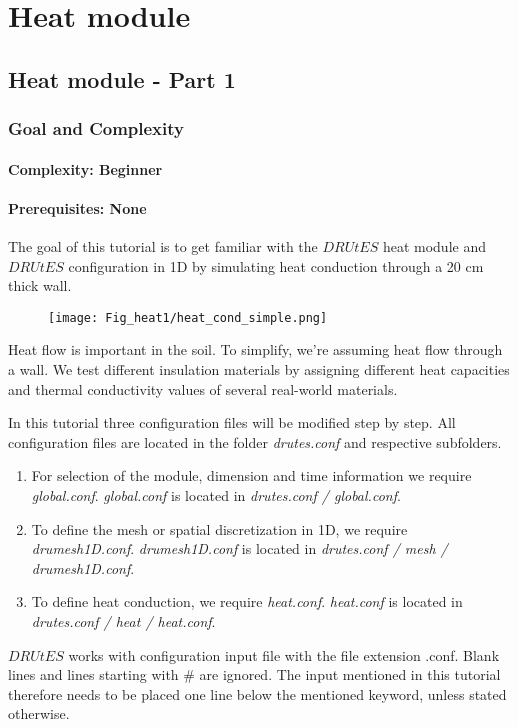 
\chapter{Heat module}

\section{Heat module - Part 1}


\subsection{Goal and Complexity}
\subsubsection*{Complexity: Beginner}

\subsubsection*{Prerequisites: None}

The goal of this tutorial is to get familiar with the $DRUtES$ heat module and  $DRUtES$ configuration in 1D by simulating heat conduction through a 20 cm thick wall.\medskip

\begin{figure}[!h]
\centering
\texttt{[image: Fig\_heat1/heat\_cond\_simple.png]}
\end{figure}
Heat flow is important in the soil. To simplify, we're assuming heat flow through a wall. We test different insulation materials by assigning different heat capacities and thermal conductivity values of several real-world materials. 

In this tutorial three configuration files will be modified step by step. All configuration files are located in the folder \emph{drutes.conf} and respective subfolders. \begin{enumerate}
\item For selection of the module, dimension and time information we require \emph{global.conf}.  \emph{global.conf} is located in \emph{drutes.conf / global.conf}. 
\item To define the mesh or spatial discretization in 1D,  we require \emph{drumesh1D.conf}. \emph{drumesh1D.conf} is located in \emph{drutes.conf / mesh / drumesh1D.conf}. 
\item To define heat conduction, we require \emph{heat.conf}. \emph{heat.conf} is located in \emph{drutes.conf / heat / heat.conf}. 
\end{enumerate}
$DRUtES$ works with configuration input file with the file extension .conf. Blank lines and lines starting with \# are ignored. The input mentioned in this tutorial therefore needs to be placed one line below the mentioned keyword, unless stated otherwise. 

